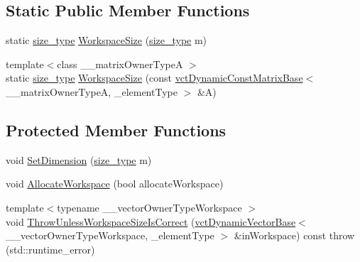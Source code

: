 \subsection*{Static Public Member Functions}
\begin{DoxyCompactItemize}
\item 
static \hyperlink{classnmr_is_orthonormal_dynamic_data_ae69581f9b270b49b1cd1d16ff29a5409}{size\+\_\+type} \hyperlink{classnmr_is_orthonormal_dynamic_data_aca18c8dd979e271e79ead883924a7e83}{Workspace\+Size} (\hyperlink{classnmr_is_orthonormal_dynamic_data_ae69581f9b270b49b1cd1d16ff29a5409}{size\+\_\+type} m)
\item 
{\footnotesize template$<$class \+\_\+\+\_\+matrix\+Owner\+Type\+A $>$ }\\static \hyperlink{classnmr_is_orthonormal_dynamic_data_ae69581f9b270b49b1cd1d16ff29a5409}{size\+\_\+type} \hyperlink{classnmr_is_orthonormal_dynamic_data_ab0932c2c04e3aa52ac6c6c57d7ebc6c3}{Workspace\+Size} (const \hyperlink{classvct_dynamic_const_matrix_base}{vct\+Dynamic\+Const\+Matrix\+Base}$<$ \+\_\+\+\_\+matrix\+Owner\+Type\+A, \+\_\+element\+Type $>$ \&A)
\end{DoxyCompactItemize}
\subsection*{Protected Member Functions}
\begin{DoxyCompactItemize}
\item 
void \hyperlink{classnmr_is_orthonormal_dynamic_data_aea3e1beee7488198722fe5413d7ad0a6}{Set\+Dimension} (\hyperlink{classnmr_is_orthonormal_dynamic_data_ae69581f9b270b49b1cd1d16ff29a5409}{size\+\_\+type} m)
\item 
void \hyperlink{classnmr_is_orthonormal_dynamic_data_a2247837026319eccc2b41aa2be968535}{Allocate\+Workspace} (bool allocate\+Workspace)
\item 
{\footnotesize template$<$typename \+\_\+\+\_\+vector\+Owner\+Type\+Workspace $>$ }\\void \hyperlink{classnmr_is_orthonormal_dynamic_data_af2d92ae79e88513e7b9eab8b343c70e2}{Throw\+Unless\+Workspace\+Size\+Is\+Correct} (\hyperlink{classvct_dynamic_vector_base}{vct\+Dynamic\+Vector\+Base}$<$ \+\_\+\+\_\+vector\+Owner\+Type\+Workspace, \+\_\+element\+Type $>$ \&in\+Workspace) const   throw (std\+::runtime\+\_\+error)
\end{DoxyCompactItemize}
